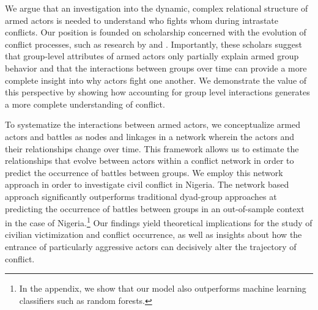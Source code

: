 We argue that an investigation into the dynamic, complex relational structure of armed actors is needed to understand who fights whom during intrastate conflicts. Our position is founded on scholarship concerned with the evolution of conflict processes, such as research by  \citet{tilly:1985}  and \citet{moore:1995}. Importantly, these scholars suggest that group-level attributes of armed actors only partially explain armed group behavior and that the interactions between groups over time can provide a more complete insight into why actors fight one another. We demonstrate the value of this perspective by showing how accounting for group level interactions generates a more complete understanding of conflict. 

To systematize the interactions between armed actors, we conceptualize armed actors and battles as nodes and linkages in a network wherein the actors and their relationships change over time. This framework allows us to estimate the relationships that evolve between actors within a conflict network in order to predict the occurrence of battles between groups.  We employ this network approach in order to investigate civil conflict in Nigeria. The network based approach significantly outperforms traditional dyad-group approaches at predicting the occurrence of battles between groups in an out-of-sample context in the case of Nigeria.\footnote{In the appendix, we show that our model also outperforms machine learning classifiers such as random forests.} Our findings yield theoretical implications for the study of civilian victimization and conflict occurrence, as well as insights about how the entrance of particularly aggressive actors can decisively alter the trajectory of conflict.